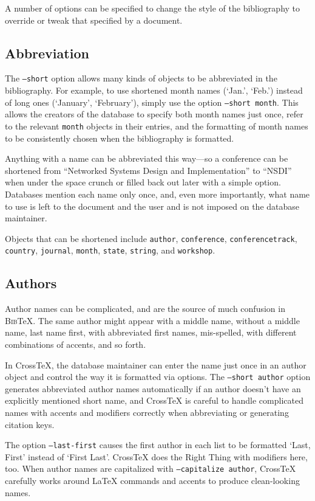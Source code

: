 \documentclass{article}
\newcommand{\XTX}{Cross\TeX}
\newcommand{\BibTeX}{\textsc{Bib}\TeX}
\begin{document}
A number of options can be specified to change the style of the
bibliography to override or tweak that specified by a document.

\subsection{Abbreviation}

The \texttt{--short} option allows many kinds of objects to be abbreviated
in the bibliography. For example, to use shortened month names (`Jan.',
`Feb.') instead of long ones (`January', `February'), simply use
the option \texttt{--short month}. This allows the creators of the
database to specify both month names just once, refer to the relevant
\texttt{month} objects in their entries, and the formatting of month
names to be consistently chosen when the bibliography is formatted.

Anything with a name can be abbreviated this way---so a conference can
be shortened from ``Networked Systems Design and Implementation'' to
``NSDI'' when under the space crunch or filled back out later with a
simple option. Databases mention each name only once, and, even more
importantly, what name to use is left to the document and the user and
is not imposed on the database maintainer.

Objects that can be shortened include \texttt{author},
\texttt{conference}, \texttt{conferencetrack}, \texttt{country},
\texttt{journal}, \texttt{month}, \texttt{state}, \texttt{string},
and \texttt{workshop}.

\subsection{Authors}

Author names can be complicated, and are the source of much confusion
in \BibTeX{}. The same author might appear with a middle name, without a
middle name, last name first, with abbreviated first names, mis-spelled,
with different combinations of accents, and so forth.

In \XTX{}, the database maintainer can enter the name just once in an
author object and control the way it is formatted via options. The
\texttt{--short author} option generates abbreviated author names
automatically if an author doesn't have an explicitly mentioned short
name, and \XTX{} is careful to handle complicated names with accents
and modifiers correctly when abbreviating or generating citation keys.

The option \texttt{--last-first} causes the first author in each list
to be formatted `Last, First' instead of `First Last'.  \XTX{} does the
Right Thing with modifiers here, too.  When author names are capitalized
with \texttt{--capitalize author}, \XTX{} carefully works around \LaTeX{}
commands and accents to produce clean-looking names.
\end{document}
